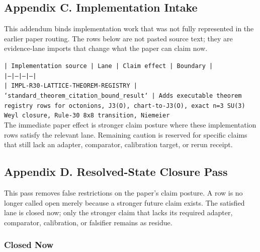 \documentclass[11pt]{article}
\begin{document}
\subsection*{Appendix C. Implementation Intake}

This addendum binds implementation work that was not fully represented in the earlier paper routing. The rows below are not pasted source text; they are evidence-lane imports that change what the paper can claim now.

\noindent\texttt{| Implementation source | Lane | Claim effect | Boundary |}\\
\noindent\texttt{|---|---|---|---|}\\
\noindent\texttt{| IMPL-R30-LATTICE-THEOREM-REGISTRY | `standard\_theorem\_citation\_bound\_result` | Adds executable theorem registry rows for octonions, J3(O), chart-to-J3(O), exact n=3 SU(3) Weyl closure, Rule-30 8x8 transition, Niemeier }\\

The immediate paper effect is stronger claim posture where these implementation rows satisfy the relevant lane. Remaining caution is reserved for specific claims that still lack an adapter, comparator, calibration target, or rerun receipt.

\subsection*{Appendix D. Resolved-State Closure Pass}

This pass removes false restrictions on the paper's claim posture. A row is no longer called open merely because a stronger future claim exists. The satisfied lane is closed now; only the stronger claim that lacks its required adapter, comparator, calibration, or falsifier remains as residue.

\subsubsection*{Closed Now}
\end{document}
